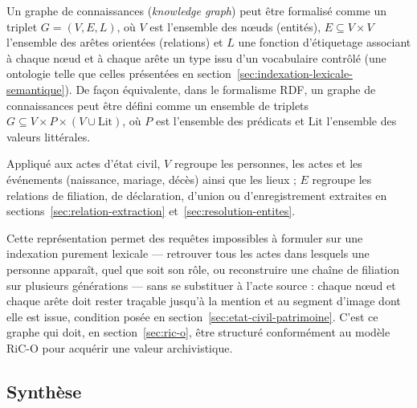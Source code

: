 Un graphe de connaissances (\textit{knowledge graph}) peut être formalisé comme un triplet $G = (V, E, L)$, où $V$ est l'ensemble des nœuds (entités), $E \subseteq V \times V$ l'ensemble des arêtes orientées (relations) et $L$ une fonction d'étiquetage associant à chaque nœud et à chaque arête un type issu d'un vocabulaire contrôlé (une ontologie telle que celles présentées en section~\ref{sec:indexation-lexicale-semantique}). De façon équivalente, dans le formalisme RDF, un graphe de connaissances peut être défini comme un ensemble de triplets $G \subseteq V \times P \times (V \cup \mathrm{Lit})$, où $P$ est l'ensemble des prédicats et $\mathrm{Lit}$ l'ensemble des valeurs littérales.

Appliqué aux actes d'état civil, $V$ regroupe les personnes, les actes et les événements (naissance, mariage, décès) ainsi que les lieux ; $E$ regroupe les relations de filiation, de déclaration, d'union ou d'enregistrement extraites en sections~\ref{sec:relation-extraction} et~\ref{sec:resolution-entites}.


Cette représentation permet des requêtes impossibles à formuler sur une indexation purement lexicale --- retrouver tous les actes dans lesquels une personne apparaît, quel que soit son rôle, ou reconstruire une chaîne de filiation sur plusieurs générations --- sans se substituer à l'acte source : chaque nœud et chaque arête doit rester traçable jusqu'à la mention et au segment d'image dont elle est issue, condition posée en section~\ref{sec:etat-civil-patrimoine}.
C'est ce graphe qui doit, en section~\ref{sec:ric-o}, être structuré conformément au modèle RiC-O pour acquérir une valeur archivistique.

\subsection{Synthèse}
\label{sec:synthese-nlp}

